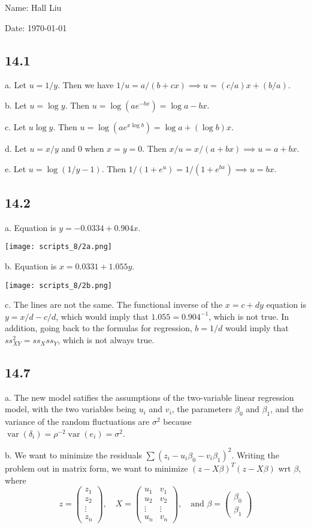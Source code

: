 \documentclass{article}
\newcommand{\openm}{\begin{pmatrix}}
\newcommand{\closem}{\end{pmatrix}}
\DeclareMathOperator{\var}{var}
\begin{document}
Name: Hall Liu

Date: \today 
\vspace{1.5cm}

\subsection*{14.1}
a. Let $u=1/y$. Then we have $1/u=a/(b+cx)\implies u=(c/a)x+(b/a)$.

\noindent b. Let $u=\log y$. Then $u=\log(ae^{-bx})=\log a-bx$.

\noindent c. Let $u\log y$. Then $u=\log(ae^{x\log b})=\log a+(\log b)x$.

\noindent d. Let $u=x/y$ and $0$ when $x=y=0$. Then $x/u=x/(a+bx)\implies u=a+bx$.

\noindent e. Let $u=\log(1/y-1)$. Then $1/(1+e^u)=1/(1+e^{bx})\implies u=bx$.
\subsection*{14.2}
a. Equation is $y=-0.0334+0.904x$. 

\texttt{[image: scripts\_8/2a.png]}

\noindent b. Equation is $x=0.0331+1.055y$. 

\texttt{[image: scripts\_8/2b.png]}

\noindent c. The lines are not the same. The functional inverse of the $x=c+dy$ equation is $y=x/d-c/d$, which would imply that $1.055=0.904^{-1}$, which is not true. In addition, going back to the formulas for regression, $b=1/d$ would imply that $ss_{XY}^2=ss_Xss_Y$, which is not always true.

\subsection*{14.7}
a. The new model satifies the assumptions of the two-variable linear regression model, with the two variables being $u_i$ and $v_i$, the parameters $\beta_0$ and $\beta_1$, and the variance of the random fluctuations are $\sigma^2$ because $\var(\delta_i)=\rho^{-2}\var(e_i)=\sigma^2$.

\noindent b. We want to minimize the residuals $\sum(z_i-u_i\beta_0-v_i\beta_1)^2$. Writing the problem out in matrix form, we want to minimize $(z-X\beta)^T(z-X\beta)$ wrt $\beta$, where 
$$z=\openm z_1\\z_2\\\vdots\\z_n\closem,\quad X=\openm u_1&v_1\\u_2&v_2\\\vdots&\vdots\\u_n&v_n\closem,\quad\text{and }\beta=\openm\beta_0\\\beta_1\closem$$
\end{document}
